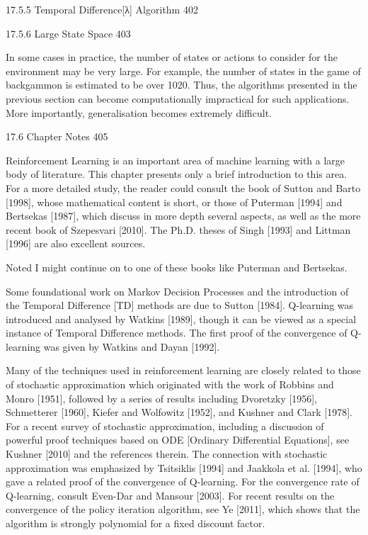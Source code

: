 17.5.5 Temporal Difference[λ] Algorithm 402



17.5.6 Large State Space 403

In some cases in practice, the number of states or actions to consider for the environment may be very large. For example, the number of states in the game of backgammon is estimated to be over 1020. Thus, the algorithms presented in the previous section can become computationally impractical for such applications. More importantly, generalisation becomes extremely difficult.

17.6 Chapter Notes 405

Reinforcement Learning is an important area of machine learning with a large body of literature. This chapter presents only a brief introduction to this area. For a more detailed study, the reader could consult the book of Sutton and Barto [1998], whose mathematical content is short, or those of Puterman [1994] and Bertsekas [1987], which discuss in more depth several aspects, as well as the more recent book of Szepesvari [2010]. The Ph.D. theses of Singh [1993] and Littman [1996] are also excellent sources.

Noted I might continue on to one of these books like Puterman and Bertsekas.

Some foundational work on Markov Decision Processes and the introduction of the Temporal Difference [TD] methods are due to Sutton [1984]. Q-learning was introduced and analysed by Watkins [1989], though it can be viewed as a special instance of Temporal Difference methods. The first proof of the convergence of Q-learning was given by Watkins and Dayan [1992].

Many of the techniques used in reinforcement learning are closely related to those of stochastic approximation which originated with the work of Robbins and Monro [1951], followed by a series of results including Dvoretzky [1956], Schmetterer [1960], Kiefer and Wolfowitz [1952], and Kushner and Clark [1978]. For a recent survey of stochastic approximation, including a discussion of powerful proof techniques based on ODE [Ordinary Differential Equations], see Kushner [2010] and the references therein. The connection with stochastic approximation was emphasized by Tsitsiklis [1994] and Jaakkola et al. [1994], who gave a related proof of the convergence of Q-learning. For the convergence rate of Q-learning, consult Even-Dar and Mansour [2003]. For recent results on the convergence of the policy iteration algorithm, see Ye [2011], which shows that the algorithm is strongly polynomial for a fixed discount factor.


